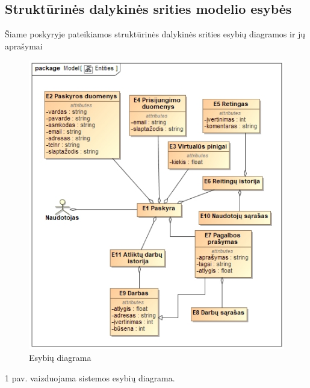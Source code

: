 \documentclass{VUMIFPSbakalaurinis}
\begin{document}
\subsection {Struktūrinės dalykinės srities modelio esybės}
Šiame poskyryje pateikiamos struktūrinės dalykinės srities esybių diagramos ir jų aprašymai
\begin{figure}[H]
	\centering
	\includegraphics[scale=0.7]{img/Entities}
	\caption{Esybių diagrama}
	\label{img:entities}
\end{figure}
1 pav. vaizduojama sistemos esybių diagrama.
\end{document}
